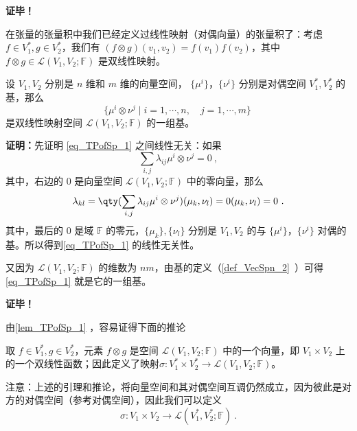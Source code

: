 \textbf{证毕！}

在张量的张量积中我们已经定义过线性映射（对偶向量）的张量积了：考虑 $f \in V^*_1,g \in V^*_2$，我们有 $(f \otimes g)(v_1, v_2) = f(v_1) f(v_2)$，其中 $f \otimes g \in \mathcal L(V_1,V_2;\mathbb F)$ 是双线性映射。

\begin{lemma}{}\label{lem_TPofSp_1}
设 $V_1,V_2$ 分别是 $n$ 维和 $m$ 维的向量空间， $\{\mu^i\}$，$\{\nu^i\}$ 分别是对偶空间 $V^*_1,V^*_2$ 的基，那么
\begin{equation}\label{eq_TPofSp_1}
\{\mu^i \otimes \nu^j \mid i=1, \cdots, n,\quad j=1,\cdots,m \}~
\end{equation}
是双线性映射空间 $\mathcal L(V_1,V_2;\mathbb F)$ 的一组基。
\end{lemma}

\textbf{证明：}先证明 \autoref{eq_TPofSp_1} 之间线性无关：如果
\begin{equation}
\sum_{i,j}\lambda_{ij}\mu^i\otimes\nu^j=0~,
\end{equation}
其中，右边的 $0$ 是向量空间 $\mathcal L(V_1,V_2;\mathbb F)$
中的零向量，那么
\begin{equation}
\lambda_{kl}=\qty(\sum_{i,j}\lambda_{ij}\mu^i\otimes\nu^j)(\mu_k,\nu_l)=0(\mu_k,\nu_l)=0~.
\end{equation}
其中，最后的 $0$ 是域 $\mathbb F$ 的零元，$\{\mu_k\},\{\nu_l\}$ 分别是 $V_1,V_2$ 的与 $\{\mu^i\}$，$\{\nu^i\}$ 对偶的基。所以得到\autoref{eq_TPofSp_1} 的线性无关性。

又因为 $\mathcal L(V_1,V_2;\mathbb F)$ 的维数为 $nm$，由基的定义（\autoref{def_VecSpn_2}~）可得\autoref{eq_TPofSp_1} 就是它的一组基。

\textbf{证毕！}

由\autoref{lem_TPofSp_1} ，容易证得下面的推论
\begin{corollary}{}\label{cor_TPofSp_1}
取 $f \in V^*_1,g \in V^*_2$，元素 $f \otimes g$ 是空间 $\mathcal L(V_1,V_2;\mathbb F)$ 中的一个向量，即 $V_1 \times V_2$ 上的一个双线性函数；因此定义了映射$\sigma: V^*_1 \times V^*_2 \to \mathcal L(V_1,V_2;\mathbb F)$。
\end{corollary}


注意：上述的引理和推论，将向量空间和其对偶空间互调仍然成立，因为彼此是对方的对偶空间（参考对偶空间），因此我们可以定义
\begin{equation}
\sigma: V_1 \times V_2 \to \mathcal L(V^*_1,V^*_2;\mathbb F)~.
\end{equation}

